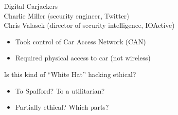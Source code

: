 \documentclass{beamer}
\begin{document}
\begin{frame}{Digital Carjackers}
\href{https://www.youtube.com/watch?v=oqe6S6m73Zw}{} \\
\bigskip
Charlie Miller (security engineer, Twitter) \\
Chris Valasek (director of security intelligence, IOActive)
\begin{itemize}
\item Took control of Car Access Network (CAN)
\item Required physical access to car (not wireless)
\end{itemize}
\pause
\bigskip
Is this kind of ``White Hat'' hacking ethical?
\begin{itemize}
\item To Spafford? To a utilitarian?
\item Partially ethical? Which parts?
\end{itemize}
\end{frame}
\end{document}
